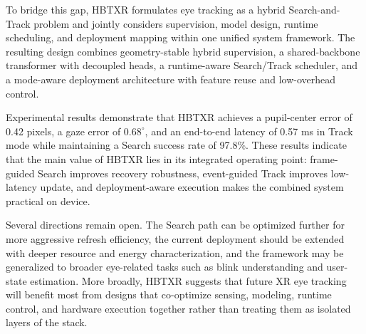 \documentclass[journal]{IEEEtran}
\begin{document}
To bridge this gap, HBTXR formulates eye tracking as a hybrid Search-and-Track problem and jointly considers supervision, model design, runtime scheduling, and deployment mapping within one unified system framework. The resulting design combines geometry-stable hybrid supervision, a shared-backbone transformer with decoupled heads, a runtime-aware Search/Track scheduler, and a mode-aware deployment architecture with feature reuse and low-overhead control.

Experimental results demonstrate that HBTXR achieves a pupil-center error of 0.42 pixels, a gaze error of $0.68^{\circ}$, and an end-to-end latency of 0.57 ms in Track mode while maintaining a Search success rate of 97.8\%. These results indicate that the main value of HBTXR lies in its integrated operating point: frame-guided Search improves recovery robustness, event-guided Track improves low-latency update, and deployment-aware execution makes the combined system practical on device.

Several directions remain open. The Search path can be optimized further for more aggressive refresh efficiency, the current deployment should be extended with deeper resource and energy characterization, and the framework may be generalized to broader eye-related tasks such as blink understanding and user-state estimation. More broadly, HBTXR suggests that future XR eye tracking will benefit most from designs that co-optimize sensing, modeling, runtime control, and hardware execution together rather than treating them as isolated layers of the stack.
\end{document}
